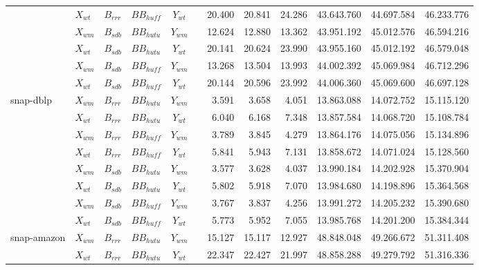 \begin{table}
\begin{tabular}{l||l|l|l|l|c||r|r|r||r|r|r}
		& $X_{wt}$ & $B_{rrr}$ & $BB_{huff}$ & \multicolumn{1}{c}{$Y_{wt}$} & & 20.400 & 20.841 & 24.286 & 43.643.760 & 44.697.584 & 46.233.776 \\ 
		& $X_{wm}$ & $B_{sdb}$ & $BB_{hutu}$ & \multicolumn{1}{c}{$Y_{wm}$} & & 12.624 & 12.880 & 13.362 & 43.951.192 & 45.012.576 & 46.594.216 \\ 
		& $X_{wt}$ & $B_{sdb}$ & $BB_{hutu}$ & \multicolumn{1}{c}{$Y_{wt}$} & & 20.141 & 20.624 & 23.990 & 43.955.160 & 45.012.192 & 46.579.048 \\ 
		& $X_{wm}$ & $B_{sdb}$ & $BB_{huff}$ & \multicolumn{1}{c}{$Y_{wm}$} & & 13.268 & 13.504 & 13.993 & 44.002.392 & 45.069.984 & 46.712.296 \\ 
		& $X_{wt}$ & $B_{sdb}$ & $BB_{huff}$ & \multicolumn{1}{c}{$Y_{wt}$} & & 20.144 & 20.596 & 23.992 & 44.006.360 & 45.069.600 & 46.697.128 \\ 
		\hline
		\multirow{8}{*}{snap-dblp} & $X_{wm}$ & $B_{rrr}$ & $BB_{hutu}$ & \multicolumn{1}{c}{$Y_{wm}$} & & 3.591 & 3.658 & 4.051 & 13.863.088 & 14.072.752 & 15.115.120 \\
		& $X_{wt}$ & $B_{rrr}$ & $BB_{hutu}$ & \multicolumn{1}{c}{$Y_{wt}$} & & 6.040 & 6.168 & 7.348 & 13.857.584 & 14.068.720 & 15.108.784 \\ 
		& $X_{wm}$ & $B_{rrr}$ & $BB_{huff}$ & \multicolumn{1}{c}{$Y_{wm}$} & & 3.789 & 3.845 & 4.279 & 13.864.176 & 14.075.056 & 15.134.896 \\ 
		& $X_{wt}$ & $B_{rrr}$ & $BB_{huff}$ & \multicolumn{1}{c}{$Y_{wt}$} & & 5.841 & 5.943 & 7.131 & 13.858.672 & 14.071.024 & 15.128.560 \\ 
		& $X_{wm}$ & $B_{sdb}$ & $BB_{hutu}$ & \multicolumn{1}{c}{$Y_{wm}$} & & 3.577 & 3.628 & 4.037 & 13.990.184 & 14.202.928 & 15.370.904 \\ 
		& $X_{wt}$ & $B_{sdb}$ & $BB_{hutu}$ & \multicolumn{1}{c}{$Y_{wt}$} & & 5.802 & 5.918 & 7.070 & 13.984.680 & 14.198.896 & 15.364.568 \\ 
		& $X_{wm}$ & $B_{sdb}$ & $BB_{huff}$ & \multicolumn{1}{c}{$Y_{wm}$} & & 3.767 & 3.837 & 4.256 & 13.991.272 & 14.205.232 & 15.390.680 \\ 
		& $X_{wt}$ & $B_{sdb}$ & $BB_{huff}$ & \multicolumn{1}{c}{$Y_{wt}$} & & 5.773 & 5.952 & 7.055 & 13.985.768 & 14.201.200 & 15.384.344 \\ 
		\hline
		\multirow{8}{*}{snap-amazon} & $X_{wm}$ & $B_{rrr}$ & $BB_{hutu}$ & \multicolumn{1}{c}{$Y_{wm}$} & & 15.127 & 15.117 & 12.927 & 48.848.048 & 49.266.672 & 51.311.408 \\
		& $X_{wt}$ & $B_{rrr}$ & $BB_{hutu}$ & \multicolumn{1}{c}{$Y_{wt}$} & & 22.347 & 22.427 & 21.997 & 48.858.288 & 49.279.792 & 51.316.336 \\ 

\end{tabular}
\end{table}
